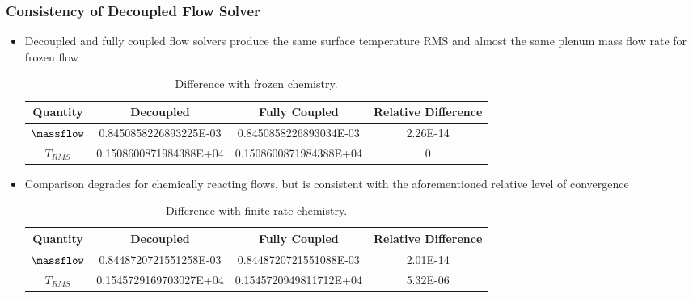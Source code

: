 \documentclass{beamer}
\begin{document}
\begin{frame}
  \frametitle{Consistency of Decoupled Flow Solver}
  \begin{itemize}
    \item Decoupled and fully coupled flow solvers produce the same surface
      temperature RMS and almost the same plenum mass flow rate for frozen flow
\begin{table}
  \centering
  \tiny
  \begin{tabular}{c|c|c|c}
    Quantity & Decoupled & Fully Coupled & Relative Difference \\
    \hline
    $\massflow$ & 0.8450858226893225E-03 & 0.8450858226893034E-03 & 2.26E-14 \\
    $T_{RMS}$   & 0.1508600871984388E+04 & 0.1508600871984388E+04 & 0
  \end{tabular}
  \caption{Difference with frozen chemistry.}
\end{table}
    \item Comparison degrades for chemically reacting flows, but is consistent
      with the aforementioned relative level of convergence
\begin{table}
  \tiny
  \centering
  \begin{tabular}{c|c|c|c}
    Quantity & Decoupled & Fully Coupled & Relative Difference \\
    \hline
    $\massflow$ & 0.8448720721551258E-03 & 0.8448720721551088E-03 & 2.01E-14 \\
    $T_{RMS}$   & 0.1545729169703027E+04 & 0.1545720949811712E+04 & 5.32E-06
  \end{tabular}
  \caption{Difference with finite-rate chemistry.}
\end{table}
  \end{itemize}
\end{frame}
\end{document}
